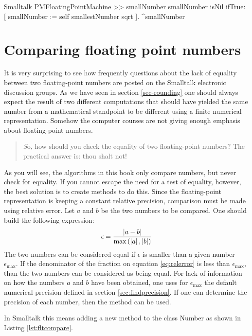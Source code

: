\begin{displaycode}{Smalltalk}
PMFloatingPointMachine >> smallNumber
    smallNumber isNil
        ifTrue: [ smallNumber := self smallestNumber sqrt ].
    ^smallNumber
\end{displaycode}

\section{Comparing floating point numbers}
It is very surprising to see how frequently questions about the
lack of equality between two floating-point numbers are posted on
the Smalltalk electronic discussion groups. As we have
seen in section \ref{sec-rounding} one should always expect the
result of two different computations that should have yielded the
same number from a mathematical standpoint to be different using a
finite  numerical representation. Somehow the computer courses are
not giving enough emphasis about floating-point numbers.

\begin{quote}
{\textsl So, how should you check the equality of two floating-point
numbers? The practical answer is: thou shalt not!}
\end{quote}

As you will see, the algorithms in this book only
compare numbers, but never check for equality. If you cannot
escape the need for a test of equality, however, the best solution
is to create methods to do this. Since the floating-point
representation is keeping a constant relative precision,
comparison must be made using relative error. Let $a$ and $b$ be
the two numbers to be compared. One should build the following
expression:
\begin{equation}
\label{eq:relerror}
\epsilon={\left|a-b\right| \over
\max\left(\left|a\right|,\left|b\right|\right)}
\end{equation}
The two numbers can be considered equal if $\epsilon$ is smaller
than a given number $\epsilon_{\max}$. If the denominator of the
fraction on equation \ref{eq:relerror} is less than
$\epsilon_{\max}$, than the two numbers can be considered as being
equal. For lack of information on how the numbers $a$ and $b$ have
been obtained, one uses for $\epsilon_{\max}$ the default
numerical precision defined in section \ref{sec:findprecision}.
If one can determine the precision of each number, then the method  can be used.

In Smalltalk this means adding a new method to the class Number as
shown in Listing \ref{lst:fltcompare}.

